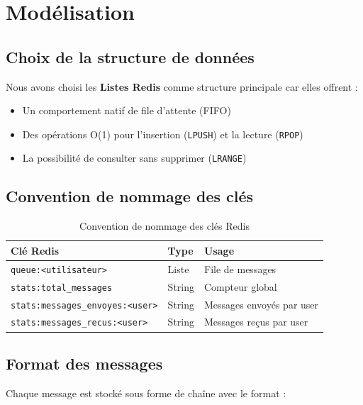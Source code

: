 \documentclass[12pt,a4paper]{article}
\begin{document}
\section{Mod\'elisation}

\subsection{Choix de la structure de donn\'ees}

Nous avons choisi les \textbf{Listes Redis} comme structure principale car elles offrent :
\begin{itemize}
    \item Un comportement natif de file d'attente (FIFO)
    \item Des op\'erations O(1) pour l'insertion (\texttt{LPUSH}) et la lecture (\texttt{RPOP})
    \item La possibilit\'e de consulter sans supprimer (\texttt{LRANGE})
\end{itemize}

\subsection{Convention de nommage des cl\'es}

\begin{table}[H]
\centering
\begin{tabular}{|l|l|l|}
\hline
\textbf{Cl\'e Redis} & \textbf{Type} & \textbf{Usage} \\
\hline
\texttt{queue:<utilisateur>} & Liste & File de messages \\
\texttt{stats:total\_messages} & String & Compteur global \\
\texttt{stats:messages\_envoyes:<user>} & String & Messages envoy\'es par user \\
\texttt{stats:messages\_recus:<user>} & String & Messages re\c{c}us par user \\
\hline
\end{tabular}
\caption{Convention de nommage des cl\'es Redis}
\end{table}

\subsection{Format des messages}

Chaque message est stock\'e sous forme de cha\^ine avec le format :
\end{document}
